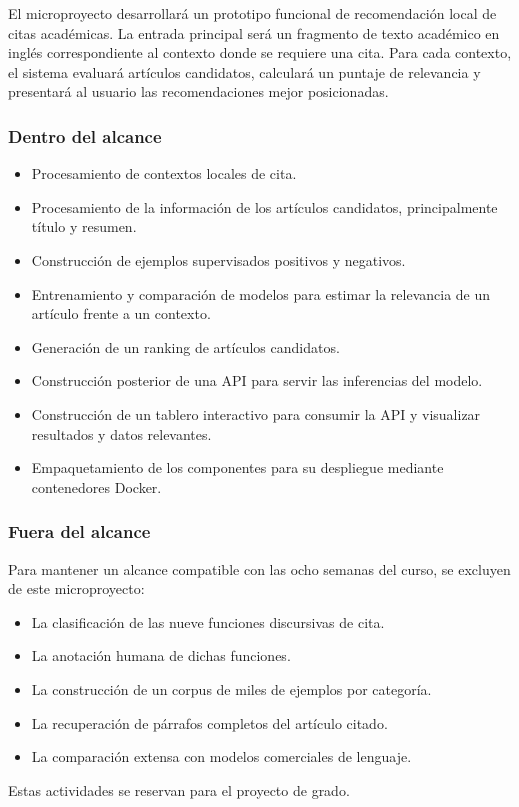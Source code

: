\documentclass[11pt]{article}
\begin{document}
El microproyecto desarrollará un prototipo funcional de recomendación local de citas académicas. La entrada principal será un fragmento de texto académico en inglés correspondiente al contexto donde se requiere una cita. Para cada contexto, el sistema evaluará artículos candidatos, calculará un puntaje de relevancia y presentará al usuario las recomendaciones mejor posicionadas.

\subsubsection{Dentro del alcance}
\begin{itemize}[leftmargin=1.4em, itemsep=2pt]
  \item Procesamiento de contextos locales de cita.
  \item Procesamiento de la información de los artículos candidatos, principalmente título y resumen.
  \item Construcción de ejemplos supervisados positivos y negativos.
  \item Entrenamiento y comparación de modelos para estimar la relevancia de un artículo frente a un contexto.
  \item Generación de un ranking de artículos candidatos.
  \item Construcción posterior de una API para servir las inferencias del modelo.
  \item Construcción de un tablero interactivo para consumir la API y visualizar resultados y datos relevantes.
  \item Empaquetamiento de los componentes para su despliegue mediante contenedores Docker.
\end{itemize}

\subsubsection{Fuera del alcance}
Para mantener un alcance compatible con las ocho semanas del curso, se excluyen de este microproyecto:
\begin{itemize}[leftmargin=1.4em, itemsep=2pt]
  \item La clasificación de las nueve funciones discursivas de cita.
  \item La anotación humana de dichas funciones.
  \item La construcción de un corpus de miles de ejemplos por categoría.
  \item La recuperación de párrafos completos del artículo citado.
  \item La comparación extensa con modelos comerciales de lenguaje.
\end{itemize}
Estas actividades se reservan para el proyecto de grado.
\end{document}
